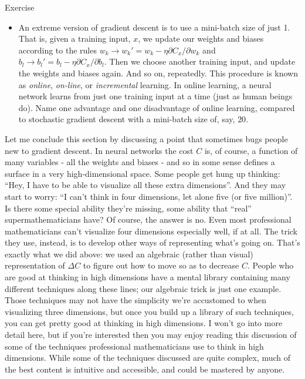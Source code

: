 \begin{exerciseBox}{Exercise}


\begin{itemize}

\item An extreme version of gradient descent is to use a mini-batch size of just 1. That is, given a training input, $x$, we update our weights and biases according to the rules $w_k \rightarrow w_k' = w_k - \eta \partial C_x / \partial w_k$ and $b_l \rightarrow b_l' = b_l - \eta \partial C_x / \partial b_l$. Then we choose another training input, and update the weights and biases again. And so on, repeatedly. This procedure is known as \emph{online}, \emph{on-line}, or \emph{incremental} learning. In online learning, a neural network learns from just one training input at a time (just as human beings do). Name one advantage and one disadvantage of online learning, compared to stochastic gradient descent with a mini-batch size of, say, $20$.

\end{itemize}


Let me conclude this section by discussing a point that sometimes bugs people new to gradient descent. In neural networks the cost $C$ is, of course, a function of many variables - all the weights and biases - and so in some sense defines a surface in a very high-dimensional space. Some people get hung up thinking: ``Hey, I have to be able to visualize all these extra dimensions''. And they may start to worry: ``I can't think in four dimensions, let alone five (or five million)''. Is there some special ability they're missing, some ability that ``real'' supermathematicians have? Of course, the answer is no. Even most professional mathematicians can't visualize four dimensions especially well, if at all. The trick they use, instead, is to develop other ways of representing what's going on. That's exactly what we did above: we used an algebraic (rather than visual) representation of $\Delta C$ to figure out how to move so as to decrease $C$. People who are good at thinking in high dimensions have a mental library containing many different techniques along these lines; our algebraic trick is just one example. Those techniques may not have the simplicity we're accustomed to when visualizing three dimensions, but once you build up a library of such techniques, you can get pretty good at thinking in high dimensions. I won't go into more detail here, but if you're interested then you may enjoy reading this discussion of some of the techniques professional mathematicians use to think in high dimensions. While some of the techniques discussed are quite complex, much of the best content is intuitive and accessible, and could be mastered by anyone.

\end{exerciseBox}



